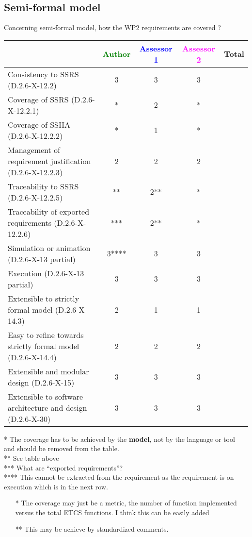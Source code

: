 \subsection{Semi-formal model}

Concerning semi-formal model, how the WP2 requirements are covered ?

\begin{tabular}{|l | c | c | c | c|}
\hline
& \textcolor{green}{Author} & \textcolor{blue}{Assessor 1} & \textcolor{magenta}{Assessor 2} & Total \\
\hline
Consistency to SSRS (D.2.6-X-12.2) &3 &3 &3 & \\
\hline
Coverage of SSRS (D.2.6-X-12.2.1) &* &2 &* & \\
\hline
Coverage of SSHA (D.2.6-X-12.2.2) &* &1 &* & \\
\hline
Management of requirement justification (D.2.6-X-12.2.3) &2 &2 &2 & \\
\hline
Traceability to SSRS (D.2.6-X-12.2.5) &** &2** &* & \\
\hline
Traceability of exported requirements (D.2.6-X-12.2.6) &*** & 2**&* & \\
\hline
Simulation or animation (D.2.6-X-13 partial) &3**** & 3 &3 & \\
\hline
Execution (D.2.6-X-13 partial) &3 &3 &3 & \\
\hline
Extensible to strictly formal model (D.2.6-X-14.3) &2 &1 &1 & \\
\hline
Easy to refine towards strictly formal model (D.2.6-X-14.4) &2 &2 &2 & \\
\hline
Extensible and modular design (D.2.6-X-15) &3 &3 &3 & \\
\hline
Extensible to software architecture and design (D.2.6-X-30) &3 &3 &3 & \\
\hline
\end{tabular}

\begin{author_comment}
* The coverage has to be achieved by the \textbf{model}, not by the language or tool and should be removed from the table.\\
** See table above\\
*** What are ``exported requirements''?\\
**** This cannot be extracted from the requirement as the requirement is on execution which is in the next row.
\end{author_comment}
\begin{assessor1}
\begin{itemize}
\item[*] The coverage may just be a metric, the number of function
  implemented versus the total ETCS functions. I think this can be
  easily added
\item[**] This may be achieve by standardized comments.
\end{itemize}
\end{assessor1}

